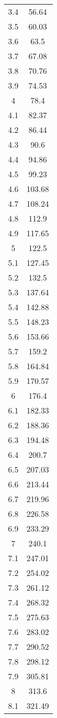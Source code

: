 \documentclass{article}
\begin{document}
\begin{longtable}[c]{| c | c |}
3.4 & 56.64\\
3.5 & 60.03\\
3.6 & 63.5\\
3.7 & 67.08\\
3.8 & 70.76\\
3.9 & 74.53\\
4 & 78.4\\
4.1 & 82.37\\
4.2 & 86.44\\
4.3 & 90.6\\
4.4 & 94.86\\
4.5 & 99.23\\
4.6 & 103.68\\
4.7 & 108.24\\
4.8 & 112.9\\
4.9 & 117.65\\
5 & 122.5\\
5.1 & 127.45\\
5.2 & 132.5\\
5.3 & 137.64\\
5.4 & 142.88\\
5.5 & 148.23\\
5.6 & 153.66\\
5.7 & 159.2\\
5.8 & 164.84\\
5.9 & 170.57\\
6 & 176.4\\
6.1 & 182.33\\
6.2 & 188.36\\
6.3 & 194.48\\
6.4 & 200.7\\
6.5 & 207.03\\
6.6 & 213.44\\
6.7 & 219.96\\
6.8 & 226.58\\
6.9 & 233.29\\
7 & 240.1\\
7.1 & 247.01\\
7.2 & 254.02\\
7.3 & 261.12\\
7.4 & 268.32\\
7.5 & 275.63\\
7.6 & 283.02\\
7.7 & 290.52\\
7.8 & 298.12\\
7.9 & 305.81\\
8 & 313.6\\
8.1 & 321.49\\

\end{longtable}
\end{document}

